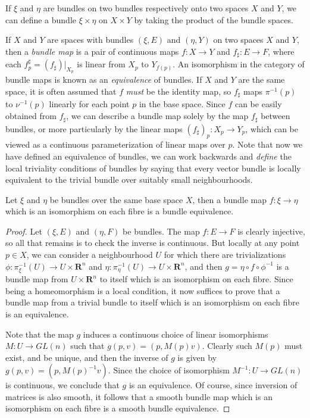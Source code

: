 \begin{example}
    If $\xi$ and $\eta$ are bundles on two bundles respectively onto two spaces $X$ and $Y$, we can define a bundle $\xi \times \eta$ on $X \times Y$ by taking the product of the bundle spaces.
\end{example}

If $X$ and $Y$ are spaces with bundles $(\xi,E)$ and $(\eta,Y)$ on two spaces $X$ and $Y$, then a \emph{bundle map} is a pair of continuous maps $f: X \to Y$ and $f_\sharp: E \to F$, where each $f^\sharp_p = (f_\sharp)|_{X_p}$ is linear from $X_p$ to $Y_{f(p)}$. An isomorphism in the category of bundle maps is known as an \emph{equivalence} of bundles. If $X$ and $Y$ are the same space, it is often assumed that $f$ {\it must} be the identity map, so $f_\sharp$ maps $\pi^{-1}(p)$ to $\nu^{-1}(p)$ linearly for each point $p$ in the base space. Since $f$ can be easily obtained from $f_\sharp$, we can describe a bundle map solely by the map $f_\sharp$ between bundles, or more particularly by the linear maps $(f_\sharp)_p: X_p \to Y_p$, which can be viewed as a continuous parameterization of linear maps over $p$. Note that now we have defined an equivalence of bundles, we can work backwards and {\it define} the local triviality conditions of bundles by saying that every vector bundle is locally equivalent to the trivial bundle over suitably small neighbourhoods.

\begin{theorem}
    Let $\xi$ and $\eta$ be bundles over the same base space $X$, then a bundle map $f: \xi \to \eta$ which is an isomorphism on each fibre is a bundle equivalence.
\end{theorem}
\begin{proof}
    Let $(\xi,E)$ and $(\eta,F)$ be bundles. The map $f: E \to F$ is clearly injective, so all that remains is to check the inverse is continuous. But locally at any point $p \in X$, we can consider a neighbourhood $U$ for which there are trivializations $\phi: \pi_\xi^{-1}(U) \to U \times \mathbf{R}^n$ and $\eta: \pi_\eta^{-1}(U) \to U \times \mathbf{R}^n$, and then $g = \eta \circ f \circ \phi^{-1}$ is a bundle map from $U \times \mathbf{R}^n$ to itself which is an isomorphism on each fibre. Since being a homeomorphism is a local condition, it now suffices to prove that a bundle map from a trivial bundle to itself which is an isomorphism on each fibre is an equivalence.

    Note that the map $g$ induces a continuous choice of linear isomorphisms $M: U \to GL(n)$ such that $g(p,v) = (p,M(p)v)$. Clearly such $M(p)$ must exist, and be unique, and then the inverse of $g$ is given by $g(p,v) = (p,M(p)^{-1} v)$. Since the choice of isomorphism $M^{-1}: U \to GL(n)$ is continuous, we conclude that $g$ is an equivalence. Of course, since inversion of matrices is also smooth, it follows that a smooth bundle map which is an isomorphism on each fibre is a smooth bundle equivalence.
\end{proof}

